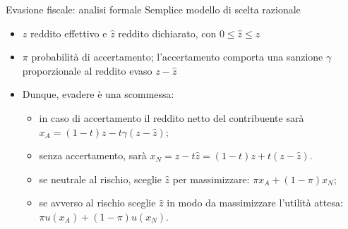 \documentclass[aspectratio=64,12pt]{beamer}
\begin{document}
\begin{frame}{Evasione fiscale: analisi formale}
Semplice modello di scelta razionale
\begin{itemize}
\item $z$ reddito effettivo e $\hat{z}$ reddito dichiarato, con $0\le\hat{z}\le z$
\item $\pi$ probabilità di accertamento; l'accertamento comporta una sanzione
$\gamma$ proporzionale al reddito evaso $z-\hat{z}$
\item Dunque, evadere è una scommessa:
\begin{itemize}
\item in caso di accertamento il reddito netto del contribuente sarà $x_A=(1-t)z-t\gamma(z-\hat z)$;
\item senza accertamento, sarà $x_N=z-t\hat{z} = (1-t)z+t(z-\hat z)$.
\item se neutrale al rischio, sceglie $\hat z$ per massimizzare: $\pi x_A + (1-\pi) x_N$;
\item se avverso al rischio sceglie $\hat z$ in modo da massimizzare l'utilità attesa: $\pi
    u(x_A)+(1-\pi)u(x_N)$.
\end{itemize}
\end{itemize}
\end{frame}
\end{document}
